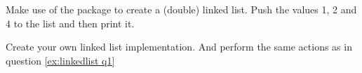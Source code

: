 \begin{Exercise}[title={Linked List},difficulty=6]
\label{ex:linkedlist}
\Question
\label{ex:linkedlist q1}
Make use of the package  to create
a (double) linked list. Push the values 1, 2 and 4 to the list and then
print it.

\Question
Create your own linked list implementation. And perform the same actions
as in question \ref{ex:linkedlist q1}
\end{Exercise}

\begin{Answer}
\Question

\Question
\end{Answer}
